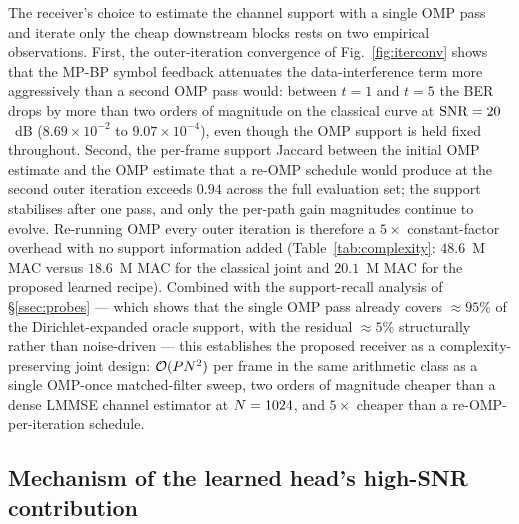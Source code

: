 The receiver's choice to estimate the channel support with a single OMP pass and iterate only the cheap downstream blocks rests on two empirical observations. First, the outer-iteration convergence of Fig.~\ref{fig:iterconv} shows that the MP-BP symbol feedback attenuates the data-interference term more aggressively than a second OMP pass would: between $t = 1$ and $t = 5$ the BER drops by more than two orders of magnitude on the classical curve at $\mathrm{SNR} = 20$~dB ($8.69 \times 10^{-2}$ to $9.07 \times 10^{-4}$), even though the OMP support is held fixed throughout. Second, the per-frame support Jaccard between the initial OMP estimate and the OMP estimate that a re-OMP schedule would produce at the second outer iteration exceeds $0.94$ across the full evaluation set; the support stabilises after one pass, and only the per-path gain magnitudes continue to evolve. Re-running OMP every outer iteration is therefore a $5\times$ constant-factor overhead with no support information added (Table~\ref{tab:complexity}: $48.6$~M MAC versus $18.6$~M MAC for the classical joint and $20.1$~M MAC for the proposed learned recipe). Combined with the support-recall analysis of \S\ref{ssec:probes} --- which shows that the single OMP pass already covers $\approx 95\%$ of the Dirichlet-expanded oracle support, with the residual $\approx 5\%$ structurally rather than noise-driven --- this establishes the proposed receiver as a complexity-preserving joint design: $\mathcal{O}(P N^2)$ per frame in the same arithmetic class as a single OMP-once matched-filter sweep, two orders of magnitude cheaper than a dense LMMSE channel estimator at $N = 1024$, and $5\times$ cheaper than a re-OMP-per-iteration schedule.

\subsection{Mechanism of the learned head's high-SNR contribution}
\label{ssec:disc_head}

